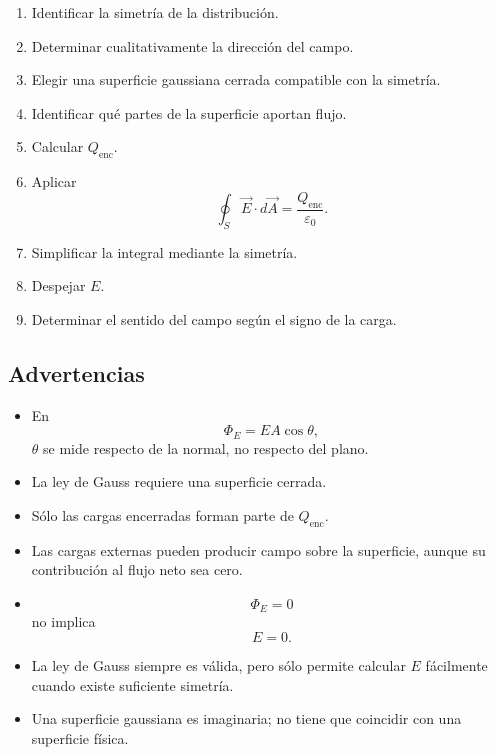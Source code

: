 \begin{enumerate}
    \item Identificar la simetría de la distribución.
    \item Determinar cualitativamente la dirección del campo.
    \item Elegir una superficie gaussiana cerrada compatible con la simetría.
    \item Identificar qué partes de la superficie aportan flujo.
    \item Calcular \(Q_{\text{enc}}\).
    \item Aplicar
    \[
    \oint_S\vec E\cdot d\vec A
    =
    \frac{Q_{\text{enc}}}{\varepsilon_0}.
    \]
    \item Simplificar la integral mediante la simetría.
    \item Despejar \(E\).
    \item Determinar el sentido del campo según el signo de la carga.
\end{enumerate}


\subsection{Advertencias}

\begin{itemize}
    \item En
    \[
    \Phi_E=EA\cos\theta,
    \]
    \(\theta\) se mide respecto de la normal, no respecto del plano.

    \item La ley de Gauss requiere una superficie cerrada.

    \item Sólo las cargas encerradas forman parte de \(Q_{\text{enc}}\).

    \item Las cargas externas pueden producir campo sobre la superficie, aunque su
    contribución al flujo neto sea cero.

    \item
    \[
    \Phi_E=0
    \]
    no implica
    \[
    E=0.
    \]

    \item La ley de Gauss siempre es válida, pero sólo permite calcular \(E\)
    fácilmente cuando existe suficiente simetría.

    \item Una superficie gaussiana es imaginaria; no tiene que coincidir con una
    superficie física.
\end{itemize}


